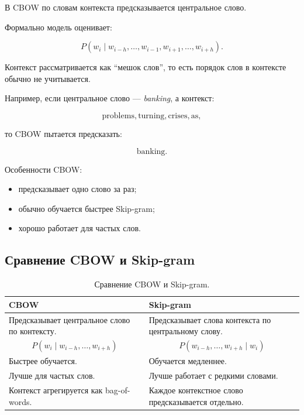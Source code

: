 \documentclass[a4paper,12pt]{article}
\begin{document}
В CBOW по словам контекста предсказывается центральное слово.

Формально модель оценивает:

\[
P(w_i \mid w_{i-h}, \dots, w_{i-1}, w_{i+1}, \dots, w_{i+h}).
\]

Контекст рассматривается как ``мешок слов'', то есть порядок слов в контексте обычно не учитывается.

Например, если центральное слово --- \textit{banking}, а контекст:

\[
\text{problems}, \text{turning}, \text{crises}, \text{as},
\]

то CBOW пытается предсказать:

\[
\text{banking}.
\]

Особенности CBOW:

\begin{itemize}
    \item предсказывает одно слово за раз;
    \item обычно обучается быстрее Skip-gram;
    \item хорошо работает для частых слов.
\end{itemize}

\subsection{Сравнение CBOW и Skip-gram}

\begin{table}[H]
\centering
\begin{tabular}{p{} p{}}
\toprule
\textbf{CBOW} & \textbf{Skip-gram} \\
\midrule
Предсказывает центральное слово по контексту. &
Предсказывает слова контекста по центральному слову. \\

\[
P(w_i \mid w_{i-h}, \dots, w_{i+h})
\]
&
\[
P(w_{i-h}, \dots, w_{i+h} \mid w_i)
\]
\\

Быстрее обучается. &
Обучается медленнее. \\

Лучше для частых слов. &
Лучше работает с редкими словами. \\

Контекст агрегируется как bag-of-words. &
Каждое контекстное слово предсказывается отдельно. \\
\bottomrule
\end{tabular}
\caption{Сравнение CBOW и Skip-gram.}
\end{table}
\end{document}
